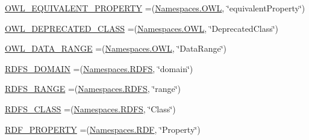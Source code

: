 \begin{DoxyCompactItemize}
\item 
\hyperlink{enumorg_1_1semanticweb_1_1owlapi_1_1vocab_1_1_o_w_l_r_d_f_vocabulary_afe857982914633cc8441c090d41a5a62}{O\-W\-L\-\_\-\-E\-Q\-U\-I\-V\-A\-L\-E\-N\-T\-\_\-\-P\-R\-O\-P\-E\-R\-T\-Y} =(\hyperlink{enumorg_1_1semanticweb_1_1owlapi_1_1vocab_1_1_namespaces_a2fcb537074d9307ef1356ffb6a5bd6f4}{Namespaces.\-O\-W\-L}, \char`\"{}equivalent\-Property\char`\"{})
\item 
\hyperlink{enumorg_1_1semanticweb_1_1owlapi_1_1vocab_1_1_o_w_l_r_d_f_vocabulary_a2505322631ddf2903e5d9fe3ae59dde1}{O\-W\-L\-\_\-\-D\-E\-P\-R\-E\-C\-A\-T\-E\-D\-\_\-\-C\-L\-A\-S\-S} =(\hyperlink{enumorg_1_1semanticweb_1_1owlapi_1_1vocab_1_1_namespaces_a2fcb537074d9307ef1356ffb6a5bd6f4}{Namespaces.\-O\-W\-L}, \char`\"{}Deprecated\-Class\char`\"{})
\item 
\hyperlink{enumorg_1_1semanticweb_1_1owlapi_1_1vocab_1_1_o_w_l_r_d_f_vocabulary_af6fa9b5977882f76c8b256a1cea56e98}{O\-W\-L\-\_\-\-D\-A\-T\-A\-\_\-\-R\-A\-N\-G\-E} =(\hyperlink{enumorg_1_1semanticweb_1_1owlapi_1_1vocab_1_1_namespaces_a2fcb537074d9307ef1356ffb6a5bd6f4}{Namespaces.\-O\-W\-L}, \char`\"{}Data\-Range\char`\"{})
\item 
\hyperlink{enumorg_1_1semanticweb_1_1owlapi_1_1vocab_1_1_o_w_l_r_d_f_vocabulary_af61808894fb13cf5e4c635e89c9dfd3b}{R\-D\-F\-S\-\_\-\-D\-O\-M\-A\-I\-N} =(\hyperlink{enumorg_1_1semanticweb_1_1owlapi_1_1vocab_1_1_namespaces_a64d32d1177b8a61cc6da656defd88a5a}{Namespaces.\-R\-D\-F\-S}, \char`\"{}domain\char`\"{})
\item 
\hyperlink{enumorg_1_1semanticweb_1_1owlapi_1_1vocab_1_1_o_w_l_r_d_f_vocabulary_a6c575edfdb9d4a3559f6cc01e4750331}{R\-D\-F\-S\-\_\-\-R\-A\-N\-G\-E} =(\hyperlink{enumorg_1_1semanticweb_1_1owlapi_1_1vocab_1_1_namespaces_a64d32d1177b8a61cc6da656defd88a5a}{Namespaces.\-R\-D\-F\-S}, \char`\"{}range\char`\"{})
\item 
\hyperlink{enumorg_1_1semanticweb_1_1owlapi_1_1vocab_1_1_o_w_l_r_d_f_vocabulary_a430e15b70fd540b0da96defddaac8868}{R\-D\-F\-S\-\_\-\-C\-L\-A\-S\-S} =(\hyperlink{enumorg_1_1semanticweb_1_1owlapi_1_1vocab_1_1_namespaces_a64d32d1177b8a61cc6da656defd88a5a}{Namespaces.\-R\-D\-F\-S}, \char`\"{}Class\char`\"{})
\item 
\hyperlink{enumorg_1_1semanticweb_1_1owlapi_1_1vocab_1_1_o_w_l_r_d_f_vocabulary_a0afb38a02891d9b0d4f7ef6890edb087}{R\-D\-F\-\_\-\-P\-R\-O\-P\-E\-R\-T\-Y} =(\hyperlink{enumorg_1_1semanticweb_1_1owlapi_1_1vocab_1_1_namespaces_a0d1c7991e82e2b5c495bb87f1123ce30}{Namespaces.\-R\-D\-F}, \char`\"{}Property\char`\"{})
\item 

\end{DoxyCompactItemize}
